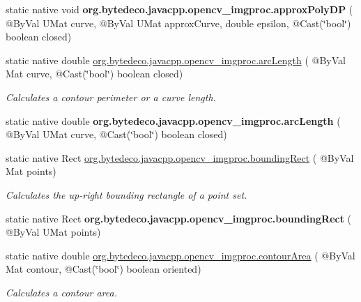 \begin{DoxyCompactItemize}
\mbox{\label{group__imgproc__shape_ga53cc7853fbb42e0adb50e055b06aed60}} 
static native void {\bfseries org.\+bytedeco.\+javacpp.\+opencv\+\_\+imgproc.\+approx\+Poly\+DP} ( @By\+Val U\+Mat curve, @By\+Val U\+Mat approx\+Curve, double epsilon, @Cast(\char`\"{}bool\char`\"{}) boolean closed)
\item 
static native double \hyperlink{group__imgproc__shape_gad6c8dc05432d5351a7480042bbbbe328}{org.\+bytedeco.\+javacpp.\+opencv\+\_\+imgproc.\+arc\+Length} ( @By\+Val Mat curve, @Cast(\char`\"{}bool\char`\"{}) boolean closed)
\begin{DoxyCompactList}\small\item\em Calculates a contour perimeter or a curve length. \end{DoxyCompactList}\item 
\mbox{\label{group__imgproc__shape_ga1cdab039b5a1b5d3c72eed7fcb024319}} 
static native double {\bfseries org.\+bytedeco.\+javacpp.\+opencv\+\_\+imgproc.\+arc\+Length} ( @By\+Val U\+Mat curve, @Cast(\char`\"{}bool\char`\"{}) boolean closed)
\item 
static native Rect \hyperlink{group__imgproc__shape_ga8e749f0c2a90af2956b90b60689d6602}{org.\+bytedeco.\+javacpp.\+opencv\+\_\+imgproc.\+bounding\+Rect} ( @By\+Val Mat points)
\begin{DoxyCompactList}\small\item\em Calculates the up-\/right bounding rectangle of a point set. \end{DoxyCompactList}\item 
\mbox{\label{group__imgproc__shape_gacafd59dde2f78776d5dc39328cd5da3a}} 
static native Rect {\bfseries org.\+bytedeco.\+javacpp.\+opencv\+\_\+imgproc.\+bounding\+Rect} ( @By\+Val U\+Mat points)
\item 
static native double \hyperlink{group__imgproc__shape_ga5de110872b0023d4176fcc7c3f2c6115}{org.\+bytedeco.\+javacpp.\+opencv\+\_\+imgproc.\+contour\+Area} ( @By\+Val Mat contour, @Cast(\char`\"{}bool\char`\"{}) boolean oriented)
\begin{DoxyCompactList}\small\item\em Calculates a contour area. \end{DoxyCompactList}\item 
\mbox{\label{group__imgproc__shape_ga63665109365ae695072d4ba834f95bbb}} 

\end{DoxyCompactItemize}
